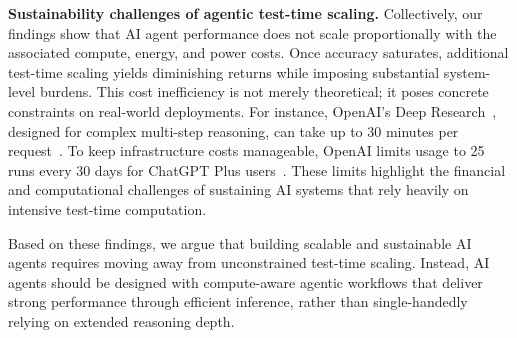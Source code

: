 {\bf Sustainability challenges of agentic test-time scaling. } Collectively, our findings show that AI agent performance does not scale proportionally with the associated compute, energy, and power costs. Once accuracy saturates, additional test-time scaling yields diminishing returns while imposing substantial system-level burdens. This cost inefficiency is not merely theoretical; it poses concrete constraints on real-world deployments. For instance, OpenAI’s Deep Research~\cite{deep_research}, designed for complex multi-step reasoning, can take up to 30 minutes per request~\cite{deep_research_faq}. To keep infrastructure costs manageable, OpenAI limits usage to 25 runs every 30 days for ChatGPT Plus users~\cite{deep_research_faq}. These limits highlight the financial and computational challenges of sustaining AI systems that rely heavily on intensive test-time computation.

Based on these findings, we argue that building scalable and sustainable AI agents requires moving away from unconstrained test-time scaling. Instead, AI agents should be designed with compute-aware agentic workflows that deliver strong performance through efficient inference, rather than single-handedly relying on extended reasoning depth. 



